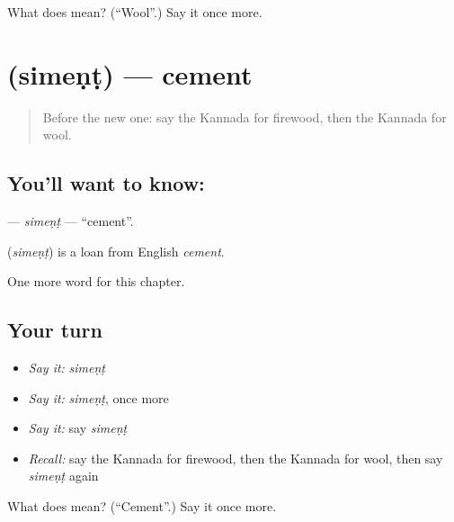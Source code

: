 \begin{tcolorbox}[breakable,colback=teal!4,colframe=teal!35!black,title={Before you move on}]
What does  mean? (\textquotedblleft{}Wool\textquotedblright{}.) Say it once more.
\end{tcolorbox}
\section[\texorpdfstring{\kn{ಸಿಮೆಂಟ್} (simeṇṭ)}{ಸಿಮೆಂಟ್ (simeṇṭ)}]{ (simeṇṭ) — cement}

\label{lesson:KA-C302-siment}



\begin{quote}
Before the new one: say the Kannada for firewood, then the Kannada for wool.
\end{quote}

\subsection*{You'll want to know: }
\textbf{} — \emph{simeṇṭ} — \textquotedblleft{}cement\textquotedblright{}.

\begin{cousinweb}
\textbf{} (\emph{simeṇṭ}) is a loan from English \emph{cement}.
\end{cousinweb}

\begin{grammarlens}[title={What you've built}]
One more word for this chapter.
\end{grammarlens}

\subsection*{Your turn}
\begin{itemize}
\raggedright
  \item \emph{Say it:} \emph{simeṇṭ}
  \item \emph{Say it:} \emph{simeṇṭ}, once more
  \item \emph{Say it:} say \emph{simeṇṭ}
  \item \emph{Recall:} say the Kannada for firewood, then the Kannada for wool, then say \emph{simeṇṭ} again
\end{itemize}

\begin{tcolorbox}[breakable,colback=teal!4,colframe=teal!35!black,title={Before you move on}]
What does  mean? (\textquotedblleft{}Cement\textquotedblright{}.) Say it once more.
\end{tcolorbox}
